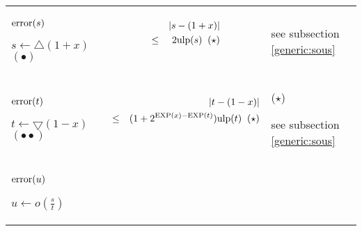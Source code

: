 \documentclass[12pt]{amsart}
\def\pinf{\bigtriangleup}
\def\minf{\bigtriangledown}
\def\ulp{{\rm ulp}}
\def\Exp{{\rm EXP}}
\begin{document}
\begin{center}
\begin{tabular}{l l l}

\begin{minipage}{2.5cm}
${\textnormal{error}}(s)$


$s \leftarrow \pinf(1+x) $
$(\bullet)$
\end{minipage} &
\begin{minipage}{7.5cm}

\begin{eqnarray}\nonumber
  &&|s-(1+x)| \\\nonumber
  &       \leq&  2 \ulp(s)\;\;(\star)\\\nonumber
\end{eqnarray}


\end{minipage} &
\begin{minipage}{6cm}

see subsection \ref{generic:sous}


\end{minipage}\\%
\begin{minipage}{2.5cm}
${\textnormal{error}}(t)$

$t \leftarrow \minf(1-x) $
$(\bullet\bullet)$
\end{minipage} &
\begin{minipage}{7.5cm}



\begin{eqnarray}\nonumber
  &&|t-(1-x)| \\\nonumber
  &       \leq&  (1+2^{\Exp(x)-\Exp(t)}) \ulp(t) \;\;(\star)\\\nonumber
\end{eqnarray}


\end{minipage} &
\begin{minipage}{6cm}

($\star$)

see subsection \ref{generic:sous}


\end{minipage}\\%
\begin{minipage}{2.5cm}
${\textnormal{error}}(u)$


$u \leftarrow o(\frac{s}{t}) $


\end{minipage} &
\begin{minipage}{7.5cm}


\end{minipage}
\end{tabular}
\end{center}
\end{document}
